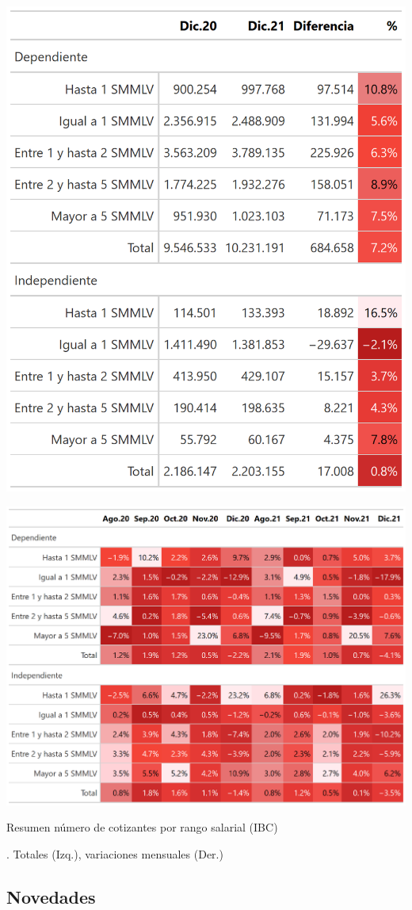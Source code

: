 \begin{table}[!h]
\centering
\begin{minipage}{0.5\textwidth}
  \centering
  \includegraphics[width=0.6\linewidth]{results/01_dinamica/salida_total_cotizantes.png}
\end{minipage}%
\begin{minipage}{0.5\textwidth}
  \centering
  \includegraphics[width=\linewidth]{results/01_dinamica/salida_total_cotizantes_variaciones.png}
\end{minipage}
\caption{Resumen número de cotizantes por rango salarial (IBC)}. Totales (Izq.), variaciones mensuales (Der.)
\label{tabla:tabla3}
\end{table}


\subsection{Novedades}


